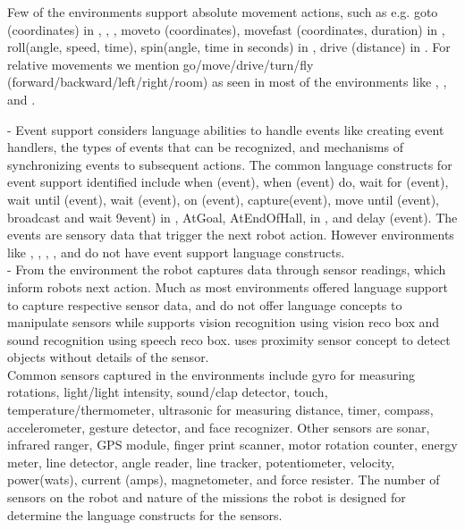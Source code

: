 Few of the environments support absolute movement actions, such as e.g. goto (coordinates) in \flyaq, \missionlab, \makeblock, moveto (coordinates), movefast (coordinates, duration) in \tivipe, roll(angle, speed, time), spin(angle, time in seconds) in \sphero, drive (distance) in \codelab. For relative movements we mention go/move/drive/turn/fly (forward/backward/left/right/room) as seen in most of the environments like \metabot, \trik, and \lego.

 - Event support considers language abilities to handle events like creating event handlers, the types of events that can be recognized, and mechanisms of synchronizing events to subsequent actions. The common language constructs for event support identified include when (event), when (event) do, wait for (event), wait until (event), wait (event), on (event), capture(event), move until (event), broadcast and wait 9event) in \vex, AtGoal, AtEndOfHall, in \missionlab, and delay (event). The events are sensory data that trigger the next robot action. However environments like \arcbotics, \tivipe, \minibloq, \turtlebot, and \robotc do not have event support language constructs.\\

 - From the environment the robot captures data through sensor readings, which inform robots next action. Much as most environments offered language support to capture respective sensor data, \turtlebot and \missionlab do not offer language concepts to manipulate sensors while \choregraphe supports vision recognition using vision reco box and sound recognition using speech reco box. \ozoblockly uses proximity sensor concept to detect objects without details of the sensor.\\

Common sensors captured in the environments include gyro for measuring rotations, light/light intensity, sound/clap detector, touch, temperature/thermometer, ultrasonic for measuring distance, timer, compass, accelerometer, gesture detector, and face recognizer. Other sensors are sonar, infrared ranger, GPS module, finger print scanner, motor rotation counter, energy meter, line detector, angle reader, line tracker, potentiometer, velocity, power(wats), current (amps), magnetometer, and force resister. The number of sensors on the robot and nature of the missions the robot is designed for determine the language constructs for the sensors.  \\


